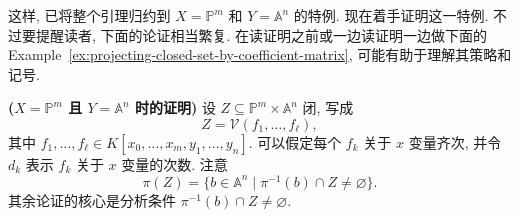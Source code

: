 \begin{Proof}
这样, 已将整个引理归约到 $X=\mathbb{P}^{m}$ 和 $Y=\mathbb{A}^{n}$ 的特例. 现在着手证明这一特例. 不过要提醒读者, 下面的论证相当繁复. 在读证明之前或一边读证明一边做下面的 Example~\ref{ex:projecting-closed-set-by-coefficient-matrix}, 可能有助于理解其策略和记号.

\textbf{($X=\mathbb{P}^{m}$ 且 $Y=\mathbb{A}^{n}$ 时的证明)} 设 $Z\subseteq\mathbb{P}^{m}\times\mathbb{A}^{n}$ 闭, 写成
\[
  Z=\mathcal{V}(f_{1},\ldots,f_{\ell}),
\]
其中 $f_{1},\ldots,f_{\ell}\in K[x_{0},\ldots,x_{m},y_{1},\ldots,y_{n}]$. 可以假定每个 $f_{k}$ 关于 $x$ 变量齐次, 并令 $d_{k}$ 表示 $f_{k}$ 关于 $x$ 变量的次数. 注意
\begin{equation}\label{eq:projection-image-nonempty-fibre}
  \pi(Z)=\{b\in\mathbb{A}^{n}\mid\pi^{-1}(b)\cap Z\ne\varnothing\}.
\end{equation}
其余论证的核心是分析条件 $\pi^{-1}(b)\cap Z\ne\varnothing$.


\end{Proof}
